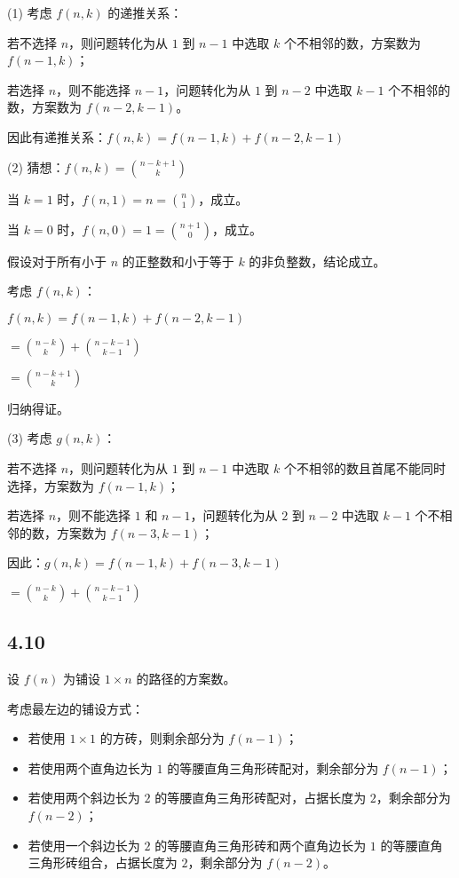 \documentclass{article}
\begin{document}
(1) 考虑 $f(n,k)$ 的递推关系：

若不选择 $n$，则问题转化为从 $1$ 到 $n-1$ 中选取 $k$ 个不相邻的数，方案数为 $f(n-1,k)$；

若选择 $n$，则不能选择 $n-1$，问题转化为从 $1$ 到 $n-2$ 中选取 $k-1$ 个不相邻的数，方案数为 $f(n-2,k-1)$。

因此有递推关系：$f(n,k)=f(n-1,k)+f(n-2,k-1)$

(2) 猜想：$f(n,k)=\binom{n-k+1}{k}$

当 $k=1$ 时，$f(n,1)=n=\binom{n}{1}$，成立。

当 $k=0$ 时，$f(n,0)=1=\binom{n+1}{0}$，成立。

假设对于所有小于 $n$ 的正整数和小于等于 $k$ 的非负整数，结论成立。

考虑 $f(n,k)$：

$f(n,k)=f(n-1,k)+f(n-2,k-1)$

$=\binom{n-k}{k}+\binom{n-k-1}{k-1}$

$=\binom{n-k+1}{k}$

归纳得证。

(3) 考虑 $g(n,k)$：

若不选择 $n$，则问题转化为从 $1$ 到 $n-1$ 中选取 $k$ 个不相邻的数且首尾不能同时选择，方案数为 $f(n-1,k)$；

若选择 $n$，则不能选择 $1$ 和 $n-1$，问题转化为从 $2$ 到 $n-2$ 中选取 $k-1$ 个不相邻的数，方案数为 $f(n-3,k-1)$；

因此：$g(n,k)=f(n-1,k)+f(n-3,k-1)$

$=\binom{n-k}{k}+\binom{n-k-1}{k-1}$

\subsection*{4.10}

设 $f(n)$ 为铺设 $1 \times n$ 的路径的方案数。

考虑最左边的铺设方式：
\begin{itemize}
\item 若使用 $1 \times 1$ 的方砖，则剩余部分为 $f(n-1)$；
\item 若使用两个直角边长为 $1$ 的等腰直角三角形砖配对，剩余部分为 $f(n-1)$；
\item 若使用两个斜边长为 $2$ 的等腰直角三角形砖配对，占据长度为 $2$，剩余部分为 $f(n-2)$；
\item 若使用一个斜边长为 $2$ 的等腰直角三角形砖和两个直角边长为 $1$ 的等腰直角三角形砖组合，占据长度为 $2$，剩余部分为 $f(n-2)$。
\end{itemize}
\end{document}
